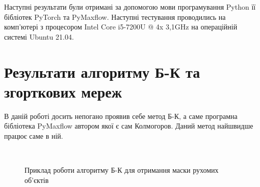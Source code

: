 Наступні результати були отримані за допомогою мови програмування Python
її бібліотек PyTorch та PyMaxflow. Наступні тестування проводились на комп'ютері з
процесором Intel Core i5-7200U @ 4x 3,1GHz на операційній системі Ubuntu 21.04.


\section{Результати алгоритму Б-К та згорткових мереж}

В даній роботі досить непогано проявив себе метод Б-К, а саме програмна бібліотека
PyMaxflow автором якої є сам Колмогоров. Даний метод найшвидше працює саме в ній.


\begin{figure}[H]
    \centering

    \\
    \caption{Приклад роботи алгоритму Б-К для отримання маски рухомих об'єктів
        \label{fig:bk_examples}
    }
\end{figure}



